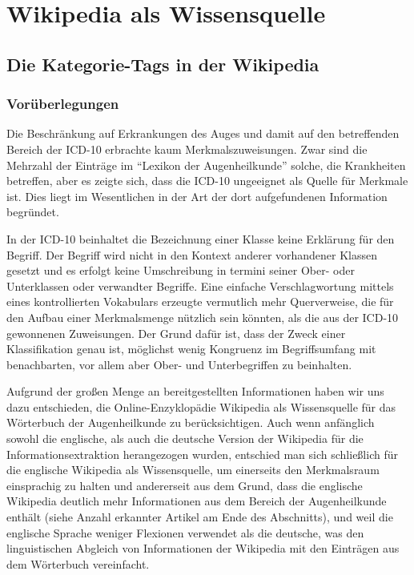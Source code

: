 \documentclass[pagesize,paper=A4,DIV=calc,fontsize=12pt,draft=false]{scrreprt}
\begin{document}
\section{Wikipedia als Wissensquelle}

\subsection{Die Kategorie-Tags in der Wikipedia}
\label{subsec:wiki_cats}

\subsubsection{Vorüberlegungen}

Die Beschränkung auf Erkrankungen des Auges und damit auf den betreffenden Bereich der ICD-10 erbrachte kaum Merkmalszuweisungen.
Zwar sind die Mehrzahl der Einträge im \enquote{Lexikon der Augenheilkunde} solche, die Krankheiten betreffen, aber es zeigte sich, dass die ICD-10 ungeeignet als Quelle für Merkmale ist. 
Dies liegt im Wesentlichen in der Art der dort aufgefundenen Information begründet. 

In der ICD-10 beinhaltet die Bezeichnung einer Klasse keine Erklärung für den Begriff. 
Der Begriff wird nicht in den Kontext anderer vorhandener Klassen gesetzt und es erfolgt keine Umschreibung in termini seiner Ober- oder Unterklassen oder verwandter Begriffe. 
Eine einfache Verschlagwortung mittels eines kontrollierten Vokabulars erzeugte vermutlich mehr Querverweise, die für den Aufbau einer Merkmalsmenge nützlich sein könnten, als die aus der ICD-10 gewonnenen Zuweisungen. 
Der Grund dafür ist, dass der Zweck einer Klassifikation genau ist, möglichst wenig Kongruenz im Begriffsumfang mit benachbarten, vor allem aber Ober- und Unterbegriffen zu beinhalten. 

Aufgrund der großen Menge an bereitgestellten Informationen haben wir uns dazu entschieden, die Online-Enzyklopädie Wikipedia als Wissensquelle für das Wörterbuch der Augenheilkunde zu berücksichtigen. 
Auch wenn anfänglich sowohl die englische, als auch die deutsche Version der Wikipedia für die Informationsextraktion herangezogen wurden, entschied man sich schließlich für die englische Wikipedia als Wissensquelle, um einerseits den Merkmalsraum einsprachig zu halten und andererseit aus dem Grund, dass die englische Wikipedia deutlich mehr Informationen aus dem Bereich der Augenheilkunde enthält (siehe Anzahl erkannter Artikel am Ende des Abschnitts), und weil die englische Sprache weniger Flexionen verwendet als die deutsche, was den linguistischen Abgleich von Informationen der Wikipedia mit den Einträgen aus dem Wörterbuch vereinfacht. 
\end{document}
